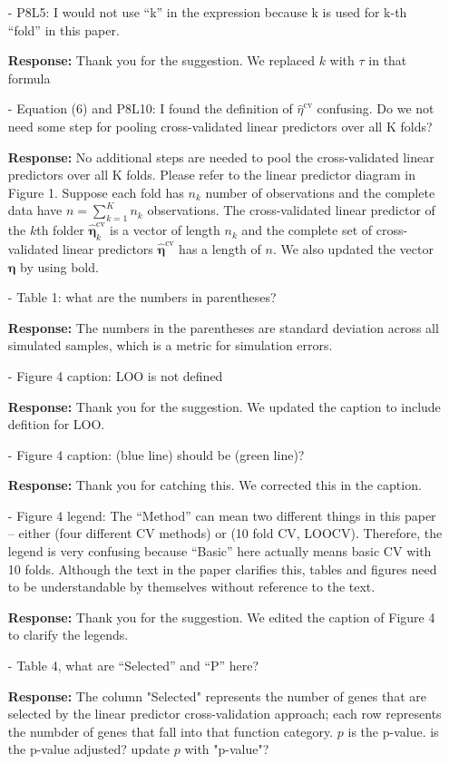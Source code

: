 \documentclass[12]{article}
\newcommand{\re}{\textbf{Response: }}
\newcommand\bd[1]{{\color{blue}#1}}
\newcommand{\boldeta}{\boldsymbol\eta}
\begin{document}
\begin{enumerate}[align = left]
\begin{itemize}[align = left]
\item[-]  P8L5: I would not use “k” in the expression because k is used for k-th “fold” in this paper.

\re Thank you for the suggestion. We replaced $k$ with $\tau$ in that formula

\item[-]  Equation (6) and P8L10: I found the definition of $\hat{\eta}^{\text{cv}}$ confusing. Do we not need some step for pooling cross-validated linear predictors over all K folds?

\re No additional steps are needed to pool the cross-validated linear predictors over all K folds. Please refer to the linear predictor diagram in Figure 1. Suppose each fold has $n_k$ number of observations and the complete data have $n = \sum_{k=1}^{K}  n_k$ observations. The cross-validated linear predictor of the $k$th folder $\hat{\boldeta}^{\text{cv}}_k$ is a vector of length $n_k$ and the complete set of cross-validated linear predictors $\hat{\boldeta}^{\text{cv}}$ has a length of $n$. We also updated the vector $\boldeta$ by using bold.
 
\item[-]  Table 1: what are the numbers in parentheses? 

\re The numbers in the parentheses are standard deviation across all simulated samples, which is a metric for simulation errors.

\item[-] Figure 4 caption: LOO is not defined

\re Thank you for the suggestion. We updated the caption to include defition for LOO.

\item[-]  Figure 4 caption: (blue line) should be (green line)?

\re Thank you for catching this. We corrected this in the caption.

\item[-]  Figure 4 legend: The “Method” can mean two different things in this paper – either (four different CV methods) or (10 fold CV, LOOCV). Therefore, the legend is very confusing because “Basic” here actually means basic CV with 10 folds. Although the text in the paper clarifies this, tables and figures need to be understandable by themselves without reference to the text.

\re Thank you for the suggestion. We edited the caption of Figure 4 to clarify the legends.

\item[-]  Table 4, what are “Selected” and “P” here?

\re The column "Selected" represents the number of genes that are selected by the linear predictor cross-validation approach; each row represents the numbder of genes that fall into that function category. $p$ is the p-value. \bd{is the p-value adjusted? update $p$ with "p-value"?}

\end{itemize}
\end{enumerate}
\end{document}
